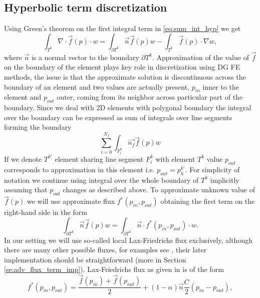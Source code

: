 \subsection{Hyperbolic term discretization}
\label{se:hyp_term}

Using Green's theorem on the first integral term in \eqref{eq:sum_int_hyp} we 
get
\begin{equation}
	\label{eq:hyp_term}
	\int_{T^k} \nabla\cdot \vec{f}(p)\cdot w = %
	\int_{\partial{T^k}} \vec{n}\vec{f}(p)w - \int_{T^k} \vec{f}(p)\cdot\nabla w,
\end{equation}
where $\vec{n}$ is a normal vector to the boundary $\partial T^k$. 
Approximation of the value of $\vec{f}$ on the boundary of the element plays 
key role in 
discretization using DG FE methods, the issue is that the 
approximate solution is discontinuous across the boundary of an element and two 
values are actually present, $p_{in}$ inner to the element and $p_{out}$ outer, 
coming from its neighbor across particular part of the boundary. Since we deal with 2D 
elements with polygonal boundary the integral over the boundary can be expressed as sum 
of integrals over line segments forming the boundary
\begin{equation}
	\sum_{i=0}^{N_f} \int_{F^k_i} \vec{n_f}\vec{f}(p)w
\end{equation}
If we denote $T^{k'}$ element sharing line segment $F^k_i$ with element $T^k$
value $p_{out}$ corresponds to approximation in this element i.e. $p_{out} = 
p^{k'}_h$. For simplicity of notation we continue using integral over the whole 
boundary of $T^k$ implicitly assuming that $p_{out}$ changes as described above. To 
approximate unknown value of $\vec{f}(p)$  we will use approximate flux $f^*(p_{in}, 
p_{out})$ obtaining the first term on the right-hand side in the form
\begin{equation}
	\label{eq:flux_integral}
	\int_{\partial{T^k}} \vec{n}\vec{f}(p)w = \int_{\partial{T^k}} \vec{n} 
	\cdot f^{*} (p_{in}, p_{out})\cdot w.
\end{equation}
In our setting we will use so-called local Lax-Friedrichs flux 
exclusively, although there are many other possible fluxes, for examples see 
\cite{Kucera, Cockburn2001a}, their later implementation should be straightforward (more 
in Section \ref{se:adv_flux_term_imp}). Lax-Friedrichs flux as given in 
\cite{Hesthaven2008} 
is of the form
\begin{equation}
	\label{eq:lax-frieflux}
	f^{*}(p_{in}, p_{out}) =   \frac{\vec{f}(p_{in}) + \vec{f}(p_{out})}{2}  + (1-\alpha) \vec{n}\frac{C}{2}(p_{in} - 
	p_{out}),
\end{equation}
